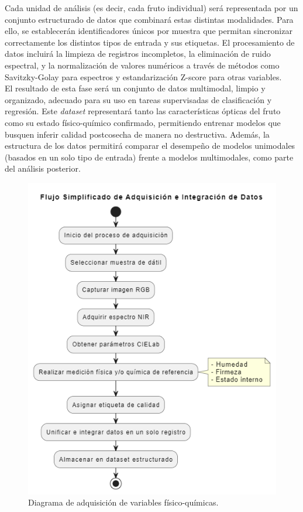 Cada unidad de análisis (es decir, cada fruto individual) será representada por un conjunto estructurado de datos que combinará estas distintas modalidades. Para ello, se establecerán identificadores únicos por muestra que permitan sincronizar correctamente los distintos tipos de entrada y sus etiquetas. El procesamiento de datos incluirá la limpieza de registros incompletos, la eliminación de ruido espectral, y la normalización de valores numéricos a través de métodos como Savitzky-Golay para espectros y estandarización Z-score para otras variables.\\

El resultado de esta fase será un conjunto de datos multimodal, limpio y organizado, adecuado para su uso en tareas supervisadas de clasificación y regresión. Este \textit{dataset} representará tanto las características ópticas del fruto como su estado físico-químico confirmado, permitiendo entrenar modelos que busquen inferir calidad postcosecha de manera no destructiva. Además, la estructura de los datos permitirá comparar el desempeño de modelos unimodales (basados en un solo tipo de entrada) frente a modelos multimodales, como parte del análisis posterior.

\begin{figure}[th]
\centering
\includegraphics[scale=0.75]{Figures/adquisicion.png}
\decoRule
\caption{Diagrama de adquisición de variables físico-químicas.}
\label{fig:Diagrama_Adquisicion}
\end{figure}

